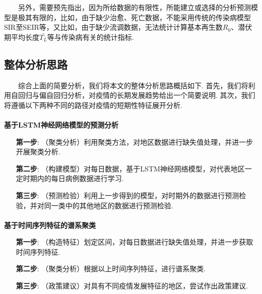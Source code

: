 \documentclass[a4paper, titlepage]{article}
\begin{document}
        　　另外，需要预先指出，因为所给数据的有限性，所能建立或选择的分析预测模型是极其有限的，比如，由于缺少治愈、死亡数据，不能采用传统的传染病模型SIR至SEIR等，又比如，由于缺少流调数据，无法统计计算基本再生数$R_0$、潜伏期平均长度$\bar{T_L}$等与传染病有关的统计指标. 

        \subsection{整体分析思路}
        　　综合上面的简要分析，我们将本文的整体分析思路概括如下. 首先，我们将利用自回归与偏自回归分析，对疫情的长期发展趋势给出一个简要说明. 其次，我们将遵循以下两种不同的路径对疫情的短期性特征展开分析.

        \paragraph{} \textbf{基于LSTM神经网络模型的预测分析}
        \vspace{5pt}
        \begin{adjustwidth}{1cm}{0cm}
        {\kaishu
        \begin{itemize}[itemsep=-1pt,topsep=1pt]
            \item [\textbf{第一步}:]（聚类分析）利用聚类方法，对地区数据进行缺失值处理，并进一步开展聚类分析.
            \item [\textbf{第二步}:]（构建模型）对每日数据，基于LSTM神经网络模型，对代表地区一定时期内的每日病例数据进行学习.
            \item [\textbf{第三步}:]（预测检验）利用上一步得到的模型，对时期外的数据进行预测检验，并对同一类中的其他地区的数据进行预测检验.
        \end{itemize}
        }
        \end{adjustwidth}
        \vspace{5pt}
        
        \paragraph{} \textbf{基于时间序列特征的谱系聚类}
        \vspace{5pt}
        \begin{adjustwidth}{1cm}{0cm}
        {\kaishu
        \begin{itemize}[itemsep=-1pt,topsep=1pt]
            \item [\textbf{第一步}:]（构造特征）划定区间，对每日数据进行缺失值处理，并进一步获取时间序列特征.
            \item [\textbf{第二步}:]（聚类分析）根据以上时间序列特征，进行谱系聚类.
            \item [\textbf{第三步}:]（政策建议）对具有不同疫情发展特征的地区，尝试作出政策建议.
        \end{itemize}
        }
        \end{adjustwidth}
\end{document}
